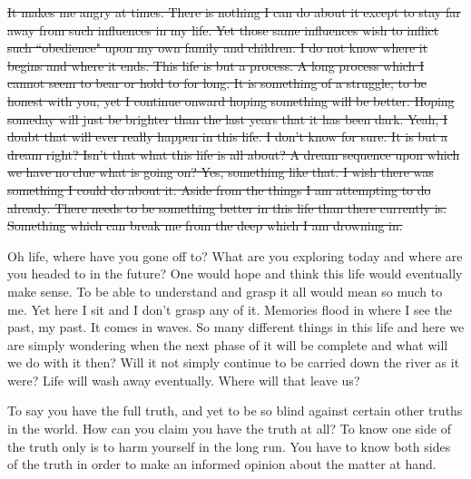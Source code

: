 \st{It makes me angry at times. There is nothing I can do about it except to 
stay far away from such influences in my life. Yet those same influences wish to 
inflict such ``obedience" upon my own family and children. I do not know where
it begins and where it ends. This life is but a process. A long process which I
cannot seem to bear or hold to for long. It is something of a struggle, to be 
honest with you, yet I continue onward hoping something will be better. Hoping
someday will just be brighter than the last years that it has been dark. Yeah,
I doubt that will ever really happen in this life. I don't know for sure. It is
but a dream right? Isn't that what this life is all about? A dream sequence upon
which we have no clue what is going on? Yes, something like that. I wish there
was something I could do about it. Aside from the things I am attempting to do
already. There needs to be something better in this life than there currently
is. Something which can break me from the deep which I am drowning in.}

Oh life, where have you gone off to? What are you exploring today and where
are you headed to in the future? One would hope and think this life would
eventually make sense. To be able to understand and grasp it all would mean so
much to me. Yet here I sit and I don't grasp any of it. Memories flood in where
I see the past, my past. It comes in waves. So many different things in this
life and here we are simply wondering when the next phase of it will be complete
and what will we do with it then? Will it not simply continue to be carried down
the river as it were? Life will wash away eventually. Where will that leave us?

To say you have the full truth, and yet to be so blind against certain other
truths in the world. How can you claim you have the truth at all? To know one
side of the truth only is to harm yourself in the long run. You have to know
both sides of the truth in order to make an informed opinion about the matter at
hand.

